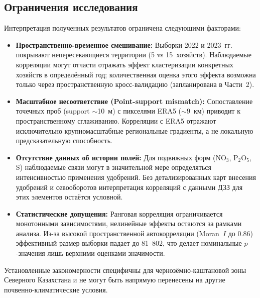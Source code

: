 \subsection{Ограничения исследования}

Интерпретация полученных результатов ограничена следующими факторами:
\begin{itemize}[nosep]
  \item \textbf{Пространственно-временное смешивание:} Выборки 2022 и 2023~гг. покрывают непересекающиеся территории (5 vs 15~хозяйств). Наблюдаемые корреляции могут отчасти отражать эффект кластеризации конкретных хозяйств в определённый год; количественная оценка этого эффекта возможна только через пространственную кросс-валидацию (запланирована в Части~2).
  \item \textbf{Масштабное несоответствие (Point-support mismatch):} Сопоставление точечных проб (support $\sim$10~м) с пикселями ERA5 ($\sim$9~км) приводит к пространственному сглаживанию. Корреляции с ERA5 отражают исключительно крупномасштабные региональные градиенты, а не локальную предсказательную способность.
  \item \textbf{Отсутствие данных об истории полей:} Для подвижных форм ($\text{NO}_3$, $\text{P}_2\text{O}_5$, S) наблюдаемые связи могут в значительной мере определяться интенсивностью применения удобрений. Без детализированных карт внесения удобрений и севооборотов интерпретация корреляций с данными ДЗЗ для этих элементов остаётся условной.
  \item \textbf{Статистические допущения:} Ранговая корреляция ограничивается монотонными зависимостями, нелинейные эффекты остаются за рамками анализа. Из-за высокой пространственной автокорреляции (Moran~$I$ до 0.86) эффективный размер выборки падает до 81--802, что делает номинальные $p$-значения лишь верхними оценками значимости.
\end{itemize}

Установленные закономерности специфичны для чернозёмно-каштановой зоны Северного Казахстана и не могут быть напрямую перенесены на другие почвенно-климатические условия.


